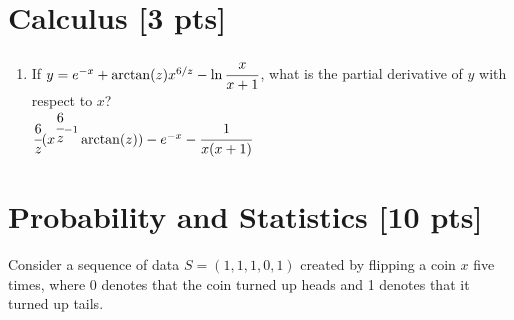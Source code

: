 \documentclass[a4paper]{article}
\theoremstyle{definition}
\newenvironment{soln}{
	\leavevmode\color{blue}\ignorespaces
}{}
\begin{document}
	
	\section{Calculus [3 pts]}
	\begin{enumerate}
		\item If $y = e^{-x} + \arctan(z)x^{6/z} - \ln\cfrac{x}{x+1}$, what is the partial derivative of $y$ with respect to $x$?\\
		\begin{soln}  $\cfrac{6}{z}(x^{\cfrac{6}{z}-1}\arctan(z))-e^{-x}-\cfrac{1}{x(x+1)}$ \end{soln}
	\end{enumerate}
	
	
	
	
	\section{Probability and Statistics [10 pts]}
	Consider a sequence of data $S = (1, 1, 1, 0, 1)$ created by flipping a coin $x$ five times, where 0 denotes that the coin turned up heads and 1 denotes that it turned up tails.
\end{document}

